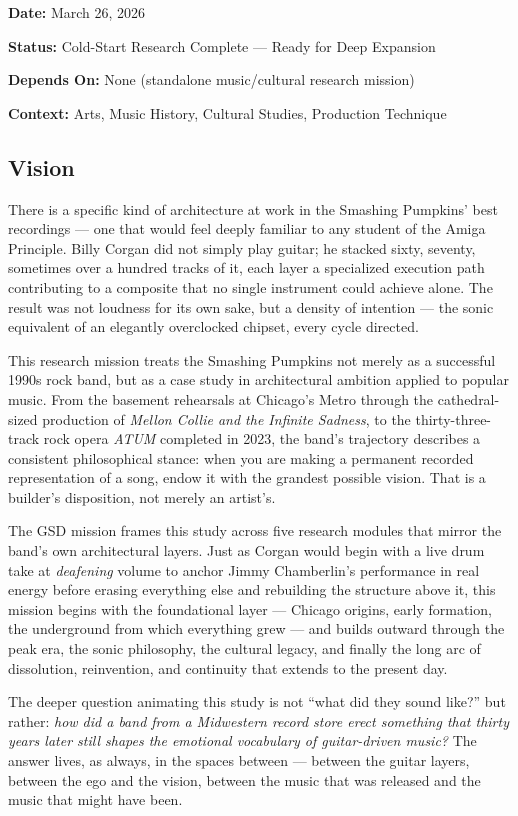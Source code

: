 \documentclass[11pt,letterpaper]{article}
\newcommand{\metafield}[2]{\textbf{\sffamily #1} #2\par}
\begin{document}
\metafield{Date:}{March 26, 2026}
\metafield{Status:}{Cold-Start Research Complete --- Ready for Deep Expansion}
\metafield{Depends On:}{None (standalone music/cultural research mission)}
\metafield{Context:}{Arts, Music History, Cultural Studies, Production Technique}

\subsection{Vision}

There is a specific kind of architecture at work in the Smashing Pumpkins' best recordings --- one that would feel deeply familiar to any student of the Amiga Principle. Billy Corgan did not simply play guitar; he stacked sixty, seventy, sometimes over a hundred tracks of it, each layer a specialized execution path contributing to a composite that no single instrument could achieve alone. The result was not loudness for its own sake, but a density of intention --- the sonic equivalent of an elegantly overclocked chipset, every cycle directed.

This research mission treats the Smashing Pumpkins not merely as a successful 1990s rock band, but as a case study in architectural ambition applied to popular music. From the basement rehearsals at Chicago's Metro through the cathedral-sized production of \textit{Mellon Collie and the Infinite Sadness}, to the thirty-three-track rock opera \textit{ATUM} completed in 2023, the band's trajectory describes a consistent philosophical stance: when you are making a permanent recorded representation of a song, endow it with the grandest possible vision. That is a builder's disposition, not merely an artist's.

The GSD mission frames this study across five research modules that mirror the band's own architectural layers. Just as Corgan would begin with a live drum take at \textit{deafening} volume to anchor Jimmy Chamberlin's performance in real energy before erasing everything else and rebuilding the structure above it, this mission begins with the foundational layer --- Chicago origins, early formation, the underground from which everything grew --- and builds outward through the peak era, the sonic philosophy, the cultural legacy, and finally the long arc of dissolution, reinvention, and continuity that extends to the present day.

The deeper question animating this study is not ``what did they sound like?'' but rather: \textit{how did a band from a Midwestern record store erect something that thirty years later still shapes the emotional vocabulary of guitar-driven music?} The answer lives, as always, in the spaces between --- between the guitar layers, between the ego and the vision, between the music that was released and the music that might have been.
\end{document}
